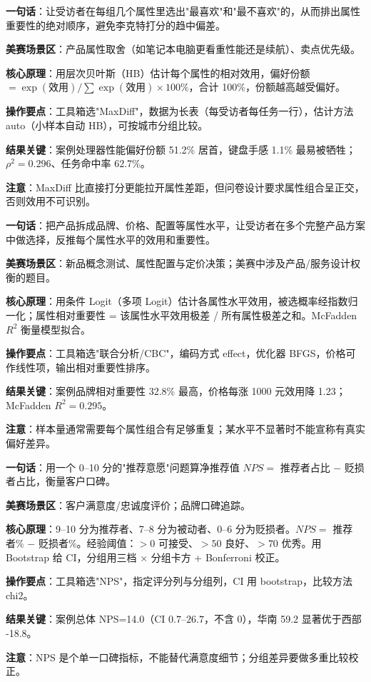 \begin{algobrief}
\textbf{一句话}：让受访者在每组几个属性里选出"最喜欢"和"最不喜欢"的，从而排出属性重要性的绝对顺序，避免李克特打分的趋中偏差。

\textbf{美赛场景区}：产品属性取舍（如笔记本电脑更看重性能还是续航）、卖点优先级。

\textbf{核心原理}：用层次贝叶斯（HB）估计每个属性的相对效用，偏好份额 $= \exp(\text{效用})/\sum \exp(\text{效用}) \times 100\%$，合计 100\%，份额越高越受偏好。

\textbf{操作要点}：工具箱选"MaxDiff"，数据为长表（每受访者每任务一行），估计方法 auto（小样本自动 HB），可按城市分组比较。

\textbf{结果关键}：案例处理器性能偏好份额 51.2\% 居首，键盘手感 1.1\% 最易被牺牲；$\rho^2=0.296$、任务命中率 62.7\%。

\textbf{注意}：MaxDiff 比直接打分更能拉开属性差距，但问卷设计要求属性组合呈正交，否则效用不可识别。
\end{algobrief}


\begin{algobrief}
\textbf{一句话}：把产品拆成品牌、价格、配置等属性水平，让受访者在多个完整产品方案中做选择，反推每个属性水平的效用和重要性。

\textbf{美赛场景区}：新品概念测试、属性配置与定价决策；美赛中涉及产品/服务设计权衡的题目。

\textbf{核心原理}：用条件 Logit（多项 Logit）估计各属性水平效用，被选概率经指数归一化；属性相对重要性 = 该属性水平效用极差 / 所有属性极差之和。McFadden $R^2$ 衡量模型拟合。

\textbf{操作要点}：工具箱选"联合分析/CBC"，编码方式 effect，优化器 BFGS，价格可作线性项，输出相对重要性排序。

\textbf{结果关键}：案例品牌相对重要性 32.8\% 最高，价格每涨 1000 元效用降 1.23；McFadden $R^2=0.295$。

\textbf{注意}：样本量通常需要每个属性组合有足够重复；某水平不显著时不能宣称有真实偏好差异。
\end{algobrief}


\begin{algobrief}
\textbf{一句话}：用一个 0--10 分的"推荐意愿"问题算净推荐值 $NPS=$ 推荐者占比 $-$ 贬损者占比，衡量客户口碑。

\textbf{美赛场景区}：客户满意度/忠诚度评价；品牌口碑追踪。

\textbf{核心原理}：9--10 分为推荐者、7--8 分为被动者、0--6 分为贬损者。$NPS = $ 推荐者\% $-$ 贬损者\%。经验阈值：$>0$ 可接受、$>50$ 良好、$>70$ 优秀。用 Bootstrap 给 CI，分组用三档 $\times$ 分组卡方 + Bonferroni 校正。

\textbf{操作要点}：工具箱选"NPS"，指定评分列与分组列，CI 用 bootstrap，比较方法 chi2。

\textbf{结果关键}：案例总体 NPS=14.0（CI $0.7$--$26.7$，不含 0），华南 59.2 显著优于西部 -18.8。

\textbf{注意}：NPS 是个单一口碑指标，不能替代满意度细节；分组差异要做多重比较校正。
\end{algobrief}

